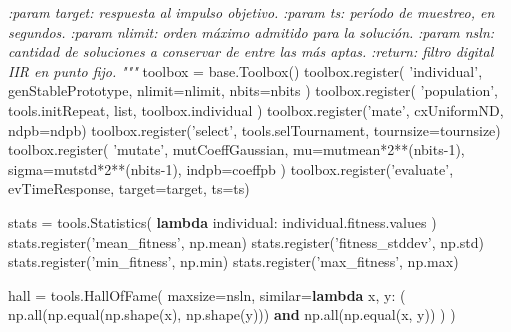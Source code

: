 \documentclass[11pt]{article}
\newenvironment{Shaded}{}{}
\newcommand{\KeywordTok}[1]{\textcolor[rgb]{0.00,0.44,0.13}{\textbf{{#1}}}}
\newcommand{\DecValTok}[1]{\textcolor[rgb]{0.25,0.63,0.44}{{#1}}}
\newcommand{\StringTok}[1]{\textcolor[rgb]{0.25,0.44,0.63}{{#1}}}
\newcommand{\CommentTok}[1]{\textcolor[rgb]{0.38,0.63,0.69}{\textit{{#1}}}}
\newcommand{\NormalTok}[1]{{#1}}
\newcommand{\OperatorTok}[1]{\textcolor[rgb]{0.40,0.40,0.40}{{#1}}}
\newcommand{\BuiltInTok}[1]{{#1}}
\begin{document}
\begin{Shaded}
\begin{Highlighting}[]
{\CommentTok{        :param target: respuesta al impulso objetivo.}
\CommentTok{        :param ts: período de muestreo, en segundos.}
\CommentTok{        :param nlimit: orden máximo admitido para la solución.}
\CommentTok{        :param nsln: cantidad de soluciones a conservar de entre las más aptas.}
\CommentTok{        :return: filtro digital IIR en punto fijo.}
\CommentTok{        """}
\NormalTok{        toolbox }\OperatorTok{=}\NormalTok{ base.Toolbox()}
\NormalTok{        toolbox.register(}
            \StringTok{'individual'}\NormalTok{, genStablePrototype, nlimit}\OperatorTok{=}\NormalTok{nlimit, nbits}\OperatorTok{=}\NormalTok{nbits}
\NormalTok{        )}
\NormalTok{        toolbox.register(}
            \StringTok{'population'}\NormalTok{, tools.initRepeat, }\BuiltInTok{list}\NormalTok{, toolbox.individual}
\NormalTok{        )}
\NormalTok{        toolbox.register(}\StringTok{'mate'}\NormalTok{, cxUniformND, ndpb}\OperatorTok{=}\NormalTok{ndpb)}
\NormalTok{        toolbox.register(}\StringTok{'select'}\NormalTok{, tools.selTournament, tournsize}\OperatorTok{=}\NormalTok{tournsize)}
\NormalTok{        toolbox.register(}
            \StringTok{'mutate'}\NormalTok{, mutCoeffGaussian, mu}\OperatorTok{=}\NormalTok{mutmean}\OperatorTok{*}\DecValTok{2}\OperatorTok{**}\NormalTok{(nbits}\DecValTok{-1}\NormalTok{),}
\NormalTok{            sigma}\OperatorTok{=}\NormalTok{mutstd}\OperatorTok{*}\DecValTok{2}\OperatorTok{**}\NormalTok{(nbits}\DecValTok{-1}\NormalTok{), indpb}\OperatorTok{=}\NormalTok{coeffpb}
\NormalTok{        )}
\NormalTok{        toolbox.register(}\StringTok{'evaluate'}\NormalTok{, evTimeResponse, target}\OperatorTok{=}\NormalTok{target, ts}\OperatorTok{=}\NormalTok{ts)}

\NormalTok{        stats }\OperatorTok{=}\NormalTok{ tools.Statistics(}
            \KeywordTok{lambda}\NormalTok{ individual: individual.fitness.values}
\NormalTok{        )}
\NormalTok{        stats.register(}\StringTok{'mean_fitness'}\NormalTok{, np.mean)}
\NormalTok{        stats.register(}\StringTok{'fitness_stddev'}\NormalTok{, np.std)}
\NormalTok{        stats.register(}\StringTok{'min_fitness'}\NormalTok{, np.}\BuiltInTok{min}\NormalTok{)}
\NormalTok{        stats.register(}\StringTok{'max_fitness'}\NormalTok{, np.}\BuiltInTok{max}\NormalTok{)}

\NormalTok{        hall }\OperatorTok{=}\NormalTok{ tools.HallOfFame(}
\NormalTok{            maxsize}\OperatorTok{=}\NormalTok{nsln, similar}\OperatorTok{=}\KeywordTok{lambda}\NormalTok{ x, y: (}
\NormalTok{                np.}\BuiltInTok{all}\NormalTok{(np.equal(np.shape(x), np.shape(y)))}
                \KeywordTok{and}\NormalTok{ np.}\BuiltInTok{all}\NormalTok{(np.equal(x, y))}
\NormalTok{            )}
\NormalTok{        )}

}
\end{Highlighting}
\end{Shaded}
\end{document}
